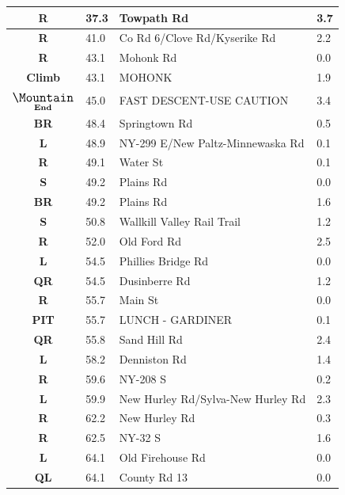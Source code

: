 \documentclass[11pt]{article}
\begin{document}
\begin{center}
\begin{supertabular}{|c|p{0.30in}|p{2.25in}|l|}
 \textbf{R} &  37.3 & Towpath Rd &   3.7 \\ \hline
{} \textbf{R} &  41.0 & Co Rd 6/Clove Rd/Kyserike Rd &   2.2 \\ \hline
{} \textbf{R} &  43.1 & Mohonk Rd &   0.0 \\ \hline
 \textbf{Climb} &  43.1 & MOHONK &   1.9 \\ \hline
 $\underset{\textbf{End}}{\text{\large \Mountain}}$ &  45.0 & FAST DESCENT-USE CAUTION &   3.4 \\ \hline
{} \textbf{BR} &  48.4 & Springtown Rd &   0.5 \\ \hline
 \textbf{L} &  48.9 & NY-299 E/New Paltz-Minnewaska Rd &   0.1 \\ \hline
{} \textbf{R} &  49.1 & Water St &   0.1 \\ \hline
 \textbf{S} &  49.2 & Plains Rd &   0.0 \\ \hline
{} \textbf{BR} &  49.2 & Plains Rd &   1.6 \\ \hline
 \textbf{S} &  50.8 & Wallkill Valley Rail Trail &   1.2 \\ \hline
{} \textbf{R} &  52.0 & Old Ford Rd &   2.5 \\ \hline
 \textbf{L} &  54.5 & Phillies Bridge Rd &   0.0 \\ \hline
{} \textbf{QR} &  54.5 & Dusinberre Rd &   1.2 \\ \hline
{} \textbf{R} &  55.7 & Main St &   0.0 \\ \hline
{} \textbf{PIT} &  55.7 & LUNCH - GARDINER &   0.1 \\ \hline
{} \textbf{QR} &  55.8 & Sand Hill Rd &   2.4 \\ \hline
 \textbf{L} &  58.2 & Denniston Rd &   1.4 \\ \hline
{} \textbf{R} &  59.6 & NY-208 S &   0.2 \\ \hline
 \textbf{L} &  59.9 & New Hurley Rd/Sylva-New Hurley Rd &   2.3 \\ \hline
{} \textbf{R} &  62.2 & New Hurley Rd &   0.3 \\ \hline
{} \textbf{R} &  62.5 & NY-32 S &   1.6 \\ \hline
 \textbf{L} &  64.1 & Old Firehouse Rd &   0.0 \\ \hline
 \textbf{QL} &  64.1 & County Rd 13 &   0.0 \\ \hline

\end{supertabular}
\end{center}
\end{document}
